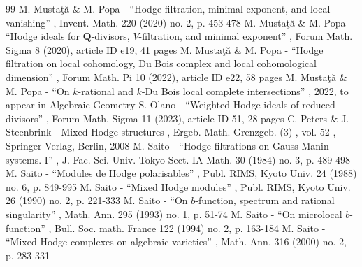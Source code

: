 \documentclass[11pt]{article}
\numberwithin{equation}{section}
\theoremstyle{plain}
\theoremstyle{definition}
\begin{document}
\begin{thebibliography}{99}
 M. Mustaţă \& M. Popa - “Hodge filtration, minimal exponent, and local vanishing” , Invent. Math. 220 (2020) no. 2, p. 453-478
 M. Mustaţă \& M. Popa - “Hodge ideals for $\mathbf{Q}$-divisors, $V$-filtration, and minimal exponent” , Forum Math. Sigma 8 (2020), article ID e19, 41 pages
 M. Mustaţă \& M. Popa - “Hodge filtration on local cohomology, Du Bois complex and local cohomological dimension” , Forum Math. Pi 10 (2022), article ID e22, 58 pages
 M. Mustaţă \& M. Popa - “On $k$-rational and $k$-Du Bois local complete intersections” , 2022, to appear in Algebraic Geometry
 S. Olano - “Weighted Hodge ideals of reduced divisors” , Forum Math. Sigma 11 (2023), article ID 51, 28 pages
 C. Peters \& J. Steenbrink - Mixed Hodge structures , Ergeb. Math. Grenzgeb. (3) , vol. 52 , Springer-Verlag, Berlin, 2008
 M. Saito - “Hodge filtrations on Gauss-Manin systems. I” , J. Fac. Sci. Univ. Tokyo Sect. IA Math. 30 (1984) no. 3, p. 489-498
 M. Saito - “Modules de Hodge polarisables” , Publ. RIMS, Kyoto Univ. 24 (1988) no. 6, p. 849-995
 M. Saito - “Mixed Hodge modules” , Publ. RIMS, Kyoto Univ. 26 (1990) no. 2, p. 221-333
 M. Saito - “On $b$-function, spectrum and rational singularity” , Math. Ann. 295 (1993) no. 1, p. 51-74
 M. Saito - “On microlocal $b$-function” , Bull. Soc. math. France 122 (1994) no. 2, p. 163-184
 M. Saito - “Mixed Hodge complexes on algebraic varieties” , Math. Ann. 316 (2000) no. 2, p. 283-331
\end{thebibliography}
\end{document}
